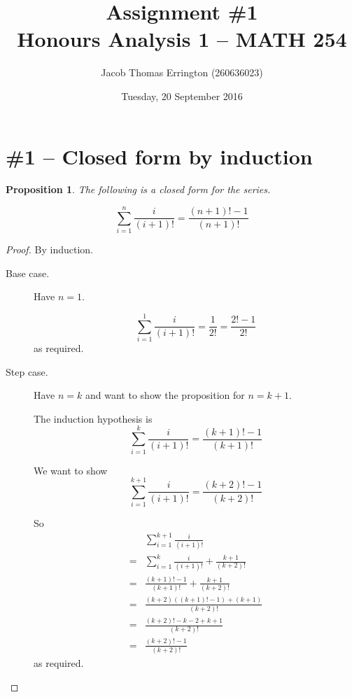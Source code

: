 \documentclass[11pt,letterpaper]{article}
\author{Jacob Thomas Errington (260636023)}
\title{Assignment \#1\\Honours Analysis 1 -- MATH 254}
\date{Tuesday, 20 September 2016}
\newtheorem{prop}{Proposition}
\begin{document}
    \maketitle

\section*{\#1 -- Closed form by induction}

\begin{prop}
    The following is a closed form for the series.

    \begin{equation*}
        \sum_{i=1}^n \frac{i}{(i+1)!} = \frac{(n+1)! - 1}{(n+1)!}
    \end{equation*}
\end{prop}

\begin{proof}
    By induction.

    \begin{description}
        \item[Base case.]
            Have $n = 1$.

            \begin{equation*}
                \sum_{i=1}^1 \frac{i}{(i+1)!}
                    = \frac{1}{2!} = \frac{2! - 1}{2!}
            \end{equation*}
            as required.

        \item[Step case.]
            Have $n = k$ and want to show the proposition for $n = k+1$.

            The induction hypothesis is
            \begin{equation*}
                \sum_{i=1}^k \frac{i}{(i+1)!} = \frac{(k+1)! - 1}{(k+1)!}
            \end{equation*}

            We want to show
            \begin{equation*}
                \sum_{i=1}^{k+1} \frac{i}{(i+1)!} = \frac{(k+2)! - 1}{(k+2)!}
            \end{equation*}

            So
            \begin{align*}
                  & \sum_{i=1}^{k+1} \frac{i}{(i+1)!} \\
                = & \sum_{i=1}^k \frac{i}{(i+1)!} + \frac{k+1}{(k+2)!} \\
                = & \frac{(k+1)! - 1}{(k+1)!} + \frac{k+1}{(k+2)!} \\
                = & \frac{(k+2)((k+1)! - 1) + (k + 1)}{(k+2)!} \\
                = & \frac{(k+2)! - k - 2 + k + 1}{(k+2)!} \\
                = & \frac{(k+2)! - 1}{(k+2)!}
            \end{align*}
            as required.
    \end{description}
\end{proof}
\end{document}
